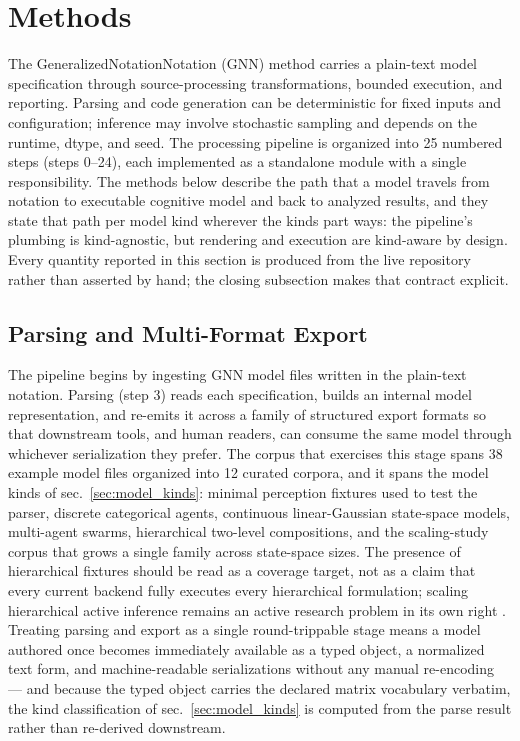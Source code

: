 \documentclass[
  english,
  9pt,
]{extarticle}
\begin{document}
\newpage

\section{Methods}\label{sec:methods}

The GeneralizedNotationNotation (GNN) method carries a plain-text model
specification through source-processing transformations, bounded
execution, and reporting. Parsing and code generation can be
deterministic for fixed inputs and configuration; inference may involve
stochastic sampling and depends on the runtime, dtype, and seed. The
processing pipeline is organized into 25 numbered steps (steps 0--24),
each implemented as a standalone module with a single responsibility.
The methods below describe the path that a model travels from notation
to executable cognitive model and back to analyzed results, and they
state that path per model kind wherever the kinds part ways: the
pipeline's plumbing is kind-agnostic, but rendering and execution are
kind-aware by design. Every quantity reported in this section is
produced from the live repository rather than asserted by hand; the
closing subsection makes that contract explicit.

\subsection{Parsing and Multi-Format
Export}\label{parsing-and-multi-format-export}

The pipeline begins by ingesting GNN model files written in the
plain-text notation. Parsing (step 3) reads each specification, builds
an internal model representation, and re-emits it across a family of
structured export formats so that downstream tools, and human readers,
can consume the same model through whichever serialization they prefer.
The corpus that exercises this stage spans 38 example model files
organized into 12 curated corpora, and it spans the model kinds of
sec.~\ref{sec:model_kinds}: minimal perception fixtures used to test the
parser, discrete categorical agents, continuous linear-Gaussian
state-space models, multi-agent swarms, hierarchical two-level
compositions, and the scaling-study corpus that grows a single family
across state-space sizes. The presence of hierarchical fixtures should
be read as a coverage target, not as a claim that every current backend
fully executes every hierarchical formulation; scaling hierarchical
active inference remains an active research problem in its own right
\citep{rangarajan2026hierarchicalSuccessor}. Treating parsing and export
as a single round-trippable stage means a model authored once becomes
immediately available as a typed object, a normalized text form, and
machine-readable serializations without any manual re-encoding --- and
because the typed object carries the declared matrix vocabulary
verbatim, the kind classification of sec.~\ref{sec:model_kinds} is
computed from the parse result rather than re-derived downstream.
\end{document}
